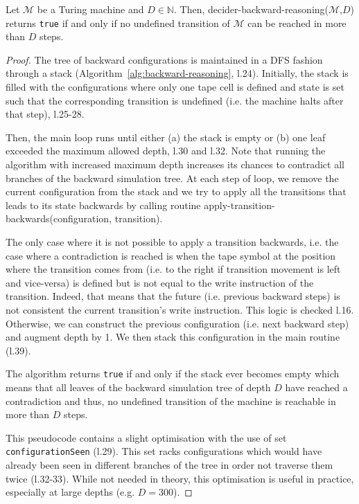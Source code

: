 \begin{theorem}\label{th:backward-reasoning}\normalfont
  Let $\mathcal{M}$ be a Turing machine and $D\in\mathbb{N}$.
  Then, {\sc decider-backward-reasoning}($\mathcal{M}$,$D$) returns \texttt{true} if and only if no undefined transition of $\mathcal{M}$ can be reached in more than $D$ steps.
\end{theorem}
\begin{proof}
  The tree of backward configurations is maintained in a DFS fashion through a stack (Algorithm~\ref{alg:backward-reasoning}, l.24). Initially, the stack is filled with the configurations where only one tape cell is defined and state is set such that the corresponding transition is undefined (i.e. the machine halts after that step), l.25-28.

  Then, the main loop runs until either (a) the stack is empty or (b) one leaf exceeded the maximum allowed depth, l.30 and l.32. Note that running the algorithm with increased maximum depth increases its chances to contradict all branches of the backward simulation tree. At each step of loop, we remove the current configuration from the stack and we try to apply all the transitions that leads to its state backwards by calling routine {\sc apply-transition-backwards}(configuration, transition).

  The only case where it is not possible to apply a transition backwards, i.e. the case where a contradiction is reached is when the tape symbol at the position where the transition comes from (i.e. to the right if transition movement is left and vice-versa) is defined but is not equal to the write instruction of the transition. Indeed, that means that the future (i.e. previous backward steps) is not consistent the current transition's write instruction. This logic is checked l.16. Otherwise, we can construct the previous configuration (i.e. next backward step) and augment depth by 1. We then stack this configuration in the main routine (l.39).

  The algorithm returns \texttt{true} if and only if the stack ever becomes empty which means that all leaves of the backward simulation tree of depth $D$ have reached a contradiction and thus, no undefined transition of the machine is reachable in more than $D$ steps.

  This pseudocode contains a slight optimisation with the use of set \texttt{configurationSeen} (l.29). This set racks configurations which would have already been seen in different branches of the tree in order not traverse them twice (l.32-33). While not needed in theory, this optimisation is useful in practice, especially at large depths (e.g. $D=300$).
\end{proof}

